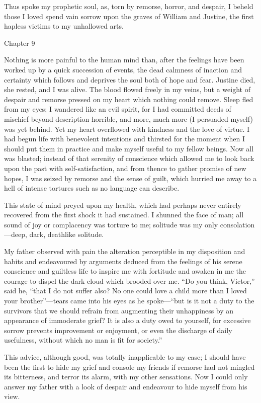\documentclass[12pt,openright]{book}
\begin{document}
Thus spoke my prophetic soul, as, torn by remorse, horror, and despair, I beheld those I loved spend vain sorrow upon the graves of William and Justine, the first hapless victims to my unhallowed arts.

Chapter 9

Nothing is more painful to the human mind than, after the feelings have been worked up by a quick succession of events, the dead calmness of inaction and certainty which follows and deprives the soul both of hope and fear. Justine died, she rested, and I was alive. The blood flowed freely in my veins, but a weight of despair and remorse pressed on my heart which nothing could remove. Sleep fled from my eyes; I wandered like an evil spirit, for I had committed deeds of mischief beyond description horrible, and more, much more (I persuaded myself) was yet behind. Yet my heart overflowed with kindness and the love of virtue. I had begun life with benevolent intentions and thirsted for the moment when I should put them in practice and make myself useful to my fellow beings. Now all was blasted; instead of that serenity of conscience which allowed me to look back upon the past with self-satisfaction, and from thence to gather promise of new hopes, I was seized by remorse and the sense of guilt, which hurried me away to a hell of intense tortures such as no language can describe.

This state of mind preyed upon my health, which had perhaps never entirely recovered from the first shock it had sustained. I shunned the face of man; all sound of joy or complacency was torture to me; solitude was my only consolation—deep, dark, deathlike solitude.

My father observed with pain the alteration perceptible in my disposition and habits and endeavoured by arguments deduced from the feelings of his serene conscience and guiltless life to inspire me with fortitude and awaken in me the courage to dispel the dark cloud which brooded over me. “Do you think, Victor,” said he, “that I do not suffer also? No one could love a child more than I loved your brother”—tears came into his eyes as he spoke—“but is it not a duty to the survivors that we should refrain from augmenting their unhappiness by an appearance of immoderate grief? It is also a duty owed to yourself, for excessive sorrow prevents improvement or enjoyment, or even the discharge of daily usefulness, without which no man is fit for society.”

This advice, although good, was totally inapplicable to my case; I should have been the first to hide my grief and console my friends if remorse had not mingled its bitterness, and terror its alarm, with my other sensations. Now I could only answer my father with a look of despair and endeavour to hide myself from his view.
\end{document}
